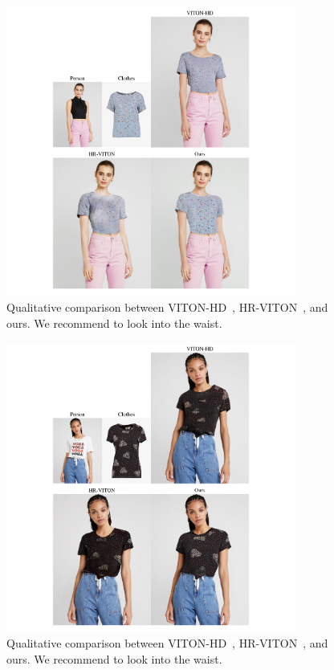 \begin{figure}[t!]
    \centering
     \includegraphics[width=0.85\textwidth]{fig_supp/fig_suppl_HD_9.pdf}
     \caption{Qualitative comparison between VITON-HD~\cite{choi2021viton}, HR-VITON~\cite{lee2022hrviton}, and ours. We recommend to look into the waist.
     }
     \label{fig_supp_tucked_in_HR_9}
\end{figure}

\begin{figure}[t!]
    \centering
     \includegraphics[width=0.85\textwidth]{fig_supp/fig_suppl_HD_10.pdf}
     \caption{Qualitative comparison between VITON-HD~\cite{choi2021viton}, HR-VITON~\cite{lee2022hrviton}, and ours. We recommend to look into the waist.
     }
     \label{fig_supp_tucked_in_HR_10}
\end{figure}

